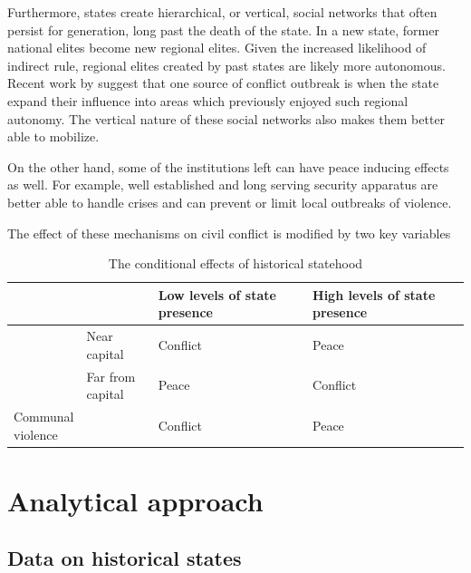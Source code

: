 Furthermore, states create hierarchical, or vertical, social networks that often
persist for generation, long past the death of the state. In a new state, former
national elites become new regional elites. Given the increased likelihood of
indirect rule, regional elites created by past states are likely more
autonomous. Recent work by \citet{Ying_2020} suggest that one source of conflict
outbreak is when the state expand their influence into areas which previously
enjoyed such regional autonomy. The vertical nature of these social networks
also makes them better able to mobilize.

On the other hand, some of the institutions left can have peace inducing effects
as well. For example, well established and long serving security apparatus are
better able to handle crises and can prevent or limit local outbreaks of
violence.

The effect of these mechanisms on civil conflict is modified by two key
variables

\begin{table}
\begin{tabularx}{\textwidth}{>{\centering\arraybackslash}X>{\centering\arraybackslash}X|>{\centering\arraybackslash}X|>{\centering\arraybackslash}X}
    & & {Low levels of state presence} & {High levels of state presence} \\
\midrule
     \multirow{2}{=}{\centering State based violence} & Near capital & Conflict &  Peace \\
     \cmidrule{2-4}
					   & \makecell{Far from \\ capital} & Peace & Conflict \\
\midrule
     \makecell{Communal\\ violence} & & Conflict & Peace \\
\end{tabularx}
\caption{The conditional effects of historical statehood}
\label{Conditional effects}
\end{table}

\section{Analytical approach} \label{Analytical approach}


\subsection{Data on historical states} \label{Data on historical states}


